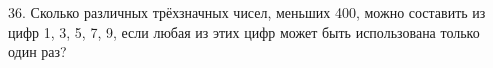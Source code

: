 36. Сколько различных трёхзначных чисел, меньших 400, можно составить из цифр 1, 3, 5, 7, 9, если любая из этих цифр может быть использована только один раз?\\
